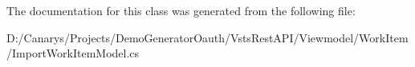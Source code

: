 The documentation for this class was generated from the following file\+:\begin{DoxyCompactItemize}
\item 
D\+:/\+Canarys/\+Projects/\+Demo\+Generator\+Oauth/\+Vsts\+Rest\+A\+P\+I/\+Viewmodel/\+Work\+Item/Import\+Work\+Item\+Model.\+cs\end{DoxyCompactItemize}
